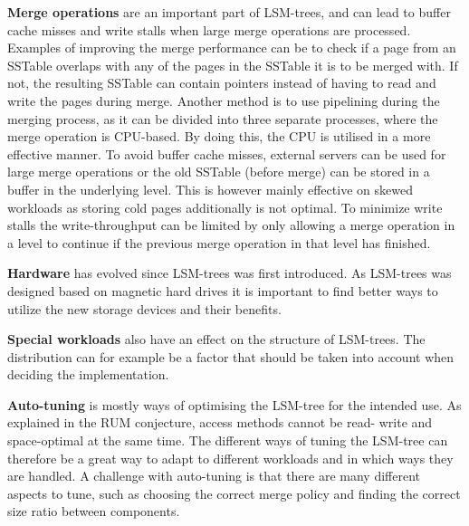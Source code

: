 \noindent
\textbf{Merge operations} are an important part of LSM-trees, and can lead to buffer cache misses and write stalls when large merge operations are processed. Examples of improving the merge performance can be to check if a page from an SSTable overlaps with any of the pages in the SSTable it is to be merged with. If not, the resulting SSTable can contain pointers instead of having to read and write the pages during merge\cite{VTTree}. Another method is to use pipelining during the merging process, as it can be divided into three separate processes, where the merge operation is CPU-based. By doing this, the CPU is utilised in a more effective manner\cite{ZhangEtAl}. To avoid buffer cache misses, external servers can be used for large merge operations\cite{AhmadEtAl} or the old SSTable (before merge) can be stored in a buffer in the underlying level\cite{LSbMTree1}\cite{LSbMTree2}. This is however mainly effective on skewed workloads as storing cold pages additionally is not optimal. To minimize write stalls the write-throughput can be limited by only allowing a merge operation in a level to continue if the previous merge operation in that level has finished\cite{bLSM}. \newline

\noindent
\textbf{Hardware} has evolved since LSM-trees was first introduced. As LSM-trees was designed based on magnetic hard drives it is important to find better ways to utilize the new storage devices and their benefits. \newline

\noindent
\textbf{Special workloads} also have an effect on the structure of LSM-trees. The distribution can for example be a factor that should be taken into account when deciding the implementation. \newline

\noindent
\textbf{Auto-tuning} is mostly ways of optimising the LSM-tree for the intended use. As explained in the RUM conjecture\cite{RUM}, access methods cannot be read- write and space-optimal at the same time. The different ways of tuning the LSM-tree can therefore be a great way to adapt to different workloads and in which ways they are handled. A challenge with auto-tuning is that there are many different aspects to tune, such as choosing the correct merge policy and finding the correct size ratio between components.
